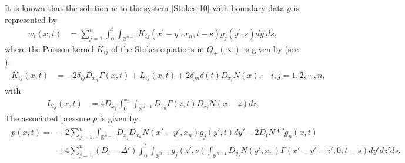 \documentclass{amsart}
\numberwithin{equation}{section}
\newcommand{\Rn}{{\mathbb R}^{n-1}}
\newcommand{\De}{\Delta}
\newcommand{\de}{\delta}
\newcommand{\Ga}{\Gamma}
\begin{document}
It is known that the solution  $w$  to the system \eqref{Stokes-10} with boundary data $g$  is represented by
\begin{align}\label{rep-bvp-stokes-w}
w_i(x,t) & = \sum_{j=1}^{n}\int_0^t \int_{\Rn} K_{ij}(
x^{\prime}-y^{\prime},x_n,t-s)g_j(y^{\prime},s) dy^{\prime}ds,
\end{align}
where  the Poisson kernel $K_{ij}$ of the Stokes equations in $Q_+ (\infty)$ is  given by   (see \cite{So}):
\begin{align}\label{Poisson-tensor-K}
\begin{split}
  K_{ij}(x,t) &  =  -2 \delta_{ij} D_{x_n}\Ga(x,t)
+ L_{ij} (x,t)  +2  \de_{jn} \de(t)  D_{x_i} N(x), \quad
i,j=1,2,\cdots, n,
\end{split}
\end{align}
with
\begin{align*}%
L_{ij} (x,t) & = 4  D_{x_j}\int_0^{x_n} \int_{\Rn}   D_{z_n}
\Ga(z,t)  D_{x_i}   N(x-z)  dz.
\end{align*}
The associated pressure $p$ is  given by
\begin{align}\label{representationpressure}
\begin{split}
p(x,t) = & -2  \sum_{j =1}^{n}\int_{\Rn} D_{x_j} D_{x_n} N(x' -y', x_n)    g_j(y', t) dy'   -2  D_t N*'  g_n (x,t) \\
& +    4\sum_{j =1}^{n}
 (D_t-\De') \int_0^t  \int_{\Rn} g_j (z',s) \int_{\Rn} D_{y_j} N(y', x_n) \Ga(x'-y' -z',0,t-s) dy' dz'ds.                                                                                                                                                                                                                                                                                                                                                                                                                                                                                                                                                                                                                                                                                                                                                                                                                                                                                                                                                                                                                                                                                                                                                                                                                                                                        
\end{split}
\end{align}
\end{document}
